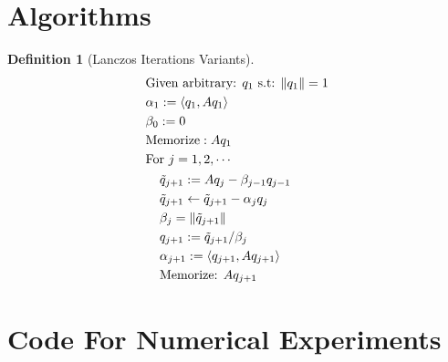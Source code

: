 \documentclass[]{article}
\theoremstyle{definition}
\newtheorem{definition}{Definition}      %
\begin{document}
\begin{appendices}
    \section{Algorithms}
    \begin{definition}[Lanczos Iterations Variants]\label{def:Lanczos Iterations Variants}
        \begin{align}
            \begin{aligned}
                & \text{Given arbitrary: }q_1 \text{ s.t: } \Vert q_1\Vert = 1
                \\
                & \alpha_1 := \langle q_1, Aq_1\rangle
                \\
                & \beta_0 := 0
                \\
                & \text{Memorize}: Aq_1
                \\
                & \text{For }j = 1, 2, \cdots
                \\
                &\hspace{1.1em}
                \begin{aligned}
                    & \tilde{q}_{j + 1} := Aq_j - \beta_{j - 1} q_{j - 1}
                    \\
                    & \tilde{q}_{j + 1} \leftarrow \tilde{q}_{j + 1} - \alpha_jq_j
                    \\
                    & \beta_j = \Vert \tilde{q}_{j + 1}\Vert
                    \\
                    & q_{j + 1}:= \tilde{q}_{j + 1}/\beta_j
                    \\
                    & \alpha_{j + 1} := \left\langle q_{j + 1}, Aq_{j + 1} \right\rangle
                    \\
                    & \text{Memorize: }Aq_{j + 1}
                \end{aligned}
            \end{aligned}
        \end{align}
    \end{definition}
    \section{Code For Numerical Experiments}
        
\end{appendices}
\newpage

\printbibliography
            
\end{document}

